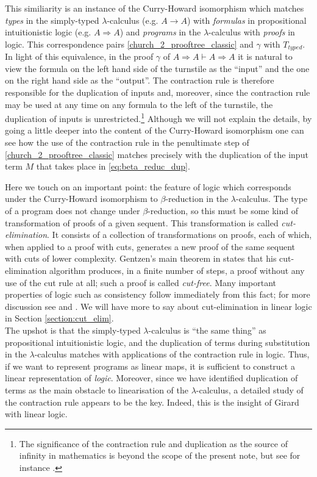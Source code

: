 \documentclass[english,letter paper,12pt,reqno]{article}
\theoremstyle{example}
\numberwithin{equation}{section}
\begin{document}
This similiarity is an instance of the Curry-Howard isomorphism \cite[\S 6]{selinger} which matches \emph{types} in the simply-typed $\lambda$-calculus (e.g. $A \rightarrow A$) with \emph{formulas} in propositional intuitionistic logic (e.g. $A \Rightarrow A$) and \emph{programs} in the $\lambda$-calculus with \emph{proofs} in logic. This correspondence pairs \eqref{church_2_prooftree_classic} and $\gamma$ with $T_{typed}$. In light of this equivalence, in the proof $\gamma$ of $A \Rightarrow A \vdash A \Rightarrow A$ it is natural to view the formula on the left hand side of the turnstile as the ``input'' and the one on the right hand side as the ``output''. The contraction rule is therefore responsible for the duplication of inputs and, moreover, since the contraction rule may be used at any time on any formula to the left of the turnstile, the duplication of inputs is unrestricted.\footnote{The significance of the contraction rule and duplication as the source of infinity in mathematics is beyond the scope of the present note, but see for instance \cite[p.78]{girard_towards}.} Although we will not explain the details, by going a little deeper into the content of the Curry-Howard isomorphism one can see how the use of the contraction rule in the penultimate step of \eqref{church_2_prooftree_classic} matches precisely with the duplication of the input term $M$ that takes place in \eqref{eq:beta_reduc_dup}.

Here we touch on an important point: the feature of logic which corresponds under the Curry-Howard isomorphism to $\beta$-reduction in the $\lambda$-calculus. The type of a program does not change under $\beta$-reduction, so this must be some kind of transformation of proofs of a given sequent. This transformation is called \emph{cut-elimination}. It consists of a collection of transformations on proofs, each of which, when applied to a proof with cuts, generates a new proof of the same sequent with cuts of lower complexity. Gentzen's main theorem in \cite{gentzen} states that his cut-elimination algorithm produces, in a finite number of steps, a proof without any use of the cut rule at all; such a proof is called \emph{cut-free}. Many important properties of logic such as consistency follow immediately from this fact; for more discussion see \cite{mellies} and \cite[Chapter 13]{girard_prooftypes}. We will have more to say about cut-elimination in linear logic in Section \ref{section:cut_elim}.
\\

The upshot is that the simply-typed $\lambda$-calculus is ``the same thing'' as propositional intuitionistic logic, and the duplication of terms during substitution in the $\lambda$-calculus matches with applications of the contraction rule in logic. Thus, if we want to represent programs as linear maps, it is sufficient to construct a linear representation of \emph{logic}. Moreover, since we have identified duplication of terms as the main obstacle to linearisation of the $\lambda$-calculus, a detailed study of the contraction rule appears to be the key. Indeed, this is the insight of Girard with linear logic.
\end{document}
